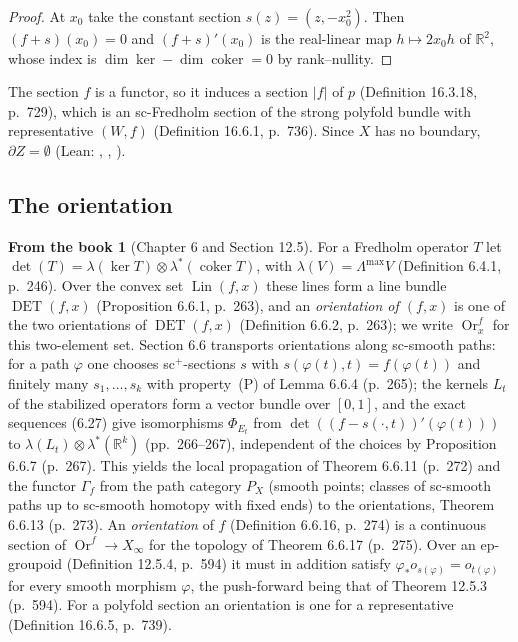 \documentclass[11pt,a4paper]{article}
\theoremstyle{plain}
\theoremstyle{definition}
\newtheorem{recall}[theorem]{From the book}
\theoremstyle{remark}
\newcommand{\R}{\mathbb{R}}
\newcommand{\abs}[1]{\lvert #1\rvert}
\newcommand{\Lin}{\operatorname{Lin}}
\newcommand{\DET}{\operatorname{DET}}
\newcommand{\Or}{\operatorname{Or}}
\newcommand{\coker}{\operatorname{coker}}
\begin{document}
\begin{proof}
At $x_0$ take the constant section $s(z)=(z,-x_0^2)$. Then $(f+s)(x_0)=0$ and $(f+s)'(x_0)$ is the
real-linear map $h\mapsto 2x_0h$ of $\R^2$, whose index is $\dim\ker-\dim\coker=0$ by rank--nullity.
\end{proof}

The section $f$ is a functor, so it induces a section $\abs f$ of $p$ (Definition 16.3.18, p.~729),
which is an sc-Fredholm section of the strong polyfold bundle with representative $(W,f)$
(Definition 16.6.1, p.~736). Since $X$ has no boundary, $\partial Z=\emptyset$ (Lean:
, , ).

\subsection{The orientation}\label{sec:orientation}

\begin{recall}[Chapter 6 and Section 12.5]\label{rec:orientation}
For a Fredholm operator $T$ let $\det(T)=\lambda(\ker T)\otimes\lambda^*(\coker T)$, with
$\lambda(V)=\Lambda^{\max}V$ (Definition 6.4.1, p.~246). Over the convex set $\Lin(f,x)$ these lines form
a line bundle $\DET(f,x)$ (Proposition 6.6.1, p.~263), and an \emph{orientation of $(f,x)$} is one of
the two orientations of $\DET(f,x)$ (Definition 6.6.2, p.~263); we write $\Or^f_x$ for this two-element
set. Section 6.6 transports orientations along sc-smooth paths: for a path $\varphi$ one chooses
sc$^+$-sections $s$ with $s(\varphi(t),t)=f(\varphi(t))$ and finitely many $s_1,\dots,s_k$ with
property~(P) of Lemma 6.6.4 (p.~265); the kernels $L_t$ of the stabilized operators form a vector
bundle over $[0,1]$, and the exact sequences (6.27) give isomorphisms $\Phi_{E_t}$ from
$\det((f-s(\cdot,t))'(\varphi(t)))$ to $\lambda(L_t)\otimes\lambda^*(\R^k)$ (pp.~266--267), independent
of the choices by Proposition 6.6.7 (p.~267). This yields the local propagation of
Theorem 6.6.11 (p.~272) and the functor $\Gamma_f$ from the path category $P_X$ (smooth points;
classes of sc-smooth paths up to sc-smooth homotopy with fixed ends) to the orientations,
Theorem 6.6.13 (p.~273). An \emph{orientation} of $f$ (Definition 6.6.16, p.~274) is a continuous
section of $\Or^f\to X_\infty$ for the topology of Theorem 6.6.17 (p.~275). Over an ep-groupoid
(Definition 12.5.4, p.~594) it must in addition satisfy $\varphi_*o_{s(\varphi)}=o_{t(\varphi)}$ for
every smooth morphism $\varphi$, the push-forward being that of Theorem 12.5.3 (p.~594). For a
polyfold section an orientation is one for a representative (Definition 16.6.5, p.~739).
\end{recall}
\end{document}
